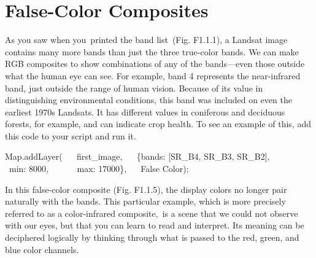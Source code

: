 \documentclass[
  letterpaper,
  DIV=11,
  numbers=noendperiod]{scrreprt}
\newenvironment{Shaded}{\begin{snugshade}}{\end{snugshade}}
\newcommand{\BuiltInTok}[1]{\textcolor[rgb]{0.00,0.23,0.31}{#1}}
\newcommand{\DataTypeTok}[1]{\textcolor[rgb]{0.68,0.00,0.00}{#1}}
\newcommand{\DecValTok}[1]{\textcolor[rgb]{0.68,0.00,0.00}{#1}}
\newcommand{\FunctionTok}[1]{\textcolor[rgb]{0.28,0.35,0.67}{#1}}
\newcommand{\NormalTok}[1]{\textcolor[rgb]{0.00,0.23,0.31}{#1}}
\newcommand{\OperatorTok}[1]{\textcolor[rgb]{0.37,0.37,0.37}{#1}}
\newcommand{\StringTok}[1]{\textcolor[rgb]{0.13,0.47,0.30}{#1}}
\begin{document}
\hypertarget{false-color-composites}{%
\section{False-Color Composites}\label{false-color-composites}}

As you saw when you~printed the band list~(Fig. F1.1.1), a Landsat image
contains many more bands than just the three true-color bands. We can
make RGB composites to show combinations of any of the bands---even
those outside what the human eye can see. For example, band 4 represents
the near-infrared band, just outside the range of human vision. Because
of its value in distinguishing environmental conditions, this band was
included on even the earliest 1970s Landsats. It has different values in
coniferous and deciduous forests, for example, and can indicate crop
health. To see an example of this, add this code to your script and run
it. ~

\begin{Shaded}
\begin{Highlighting}[]
\BuiltInTok{Map}\OperatorTok{.}\FunctionTok{addLayer}\NormalTok{(  }
\NormalTok{   first\_image}\OperatorTok{,}  
\NormalTok{   \{}\DataTypeTok{bands}\OperatorTok{:}\NormalTok{ [}\StringTok{\textquotesingle{}SR\_B4\textquotesingle{}}\OperatorTok{,} \StringTok{\textquotesingle{}SR\_B3\textquotesingle{}}\OperatorTok{,} \StringTok{\textquotesingle{}SR\_B2\textquotesingle{}}\NormalTok{]}\OperatorTok{,}  
      \DataTypeTok{ min}\OperatorTok{:} \DecValTok{8000}\OperatorTok{,}  
      \DataTypeTok{ max}\OperatorTok{:} \DecValTok{17000}\NormalTok{\}}\OperatorTok{,}   
    \StringTok{\textquotesingle{}False Color\textquotesingle{}}\NormalTok{)}\OperatorTok{;}
\end{Highlighting}
\end{Shaded}

In this false-color composite (Fig. F1.1.5), the display colors no
longer pair naturally with the bands. This particular example, which is
more precisely referred to as a color-infrared composite,~is a scene
that we could not observe with our eyes, but that you can learn to read
and interpret. Its meaning can be deciphered logically by thinking
through what is passed to the red, green, and blue color channels.
\end{document}
